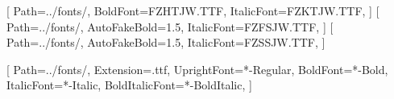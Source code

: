 \pagestyle{fancy} %
\fancyhf{} %

\renewcommand{\headrulewidth}{0pt} %

\cfoot{\thepage\ / \pageref*{LastPage}} %


\fancypagestyle{plain}{
    \fancyhf{} %
    \renewcommand{\headrulewidth}{0pt} %
    \cfoot{\thepage\ / \pageref*{LastPage}} %
}


\usepackage[T1]{fontenc} %
\usepackage{anyfontsize}
\usepackage{libertine} %

[ %
    Path=../fonts/,
    BoldFont=FZHTJW.TTF, %
    ItalicFont=FZKTJW.TTF, %
]
[ %
    Path=../fonts/,
    AutoFakeBold=1.5,  %
    ItalicFont=FZFSJW.TTF, %
]
[ %
    Path=../fonts/,
    AutoFakeBold=1.5,  %
    ItalicFont=FZSSJW.TTF, %
]

\setmonofont{MapleMono-NF-CN}[ %
    Path=../fonts/, %
    Extension=.ttf, %
    UprightFont=*-Regular, %
    BoldFont=*-Bold, %
    ItalicFont=*-Italic, %
    BoldItalicFont=*-BoldItalic, %
]


\usepackage{annotate-equations} %



